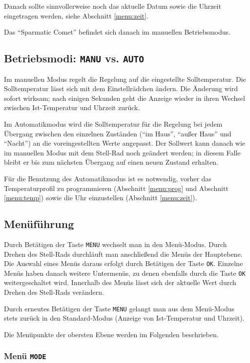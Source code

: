 \documentclass[a5paper]{article}
\newcommand\SC{"`Sparmatic Comet"'}
\begin{document}
Danach sollte sinnvollerweise noch das aktuelle Datum sowie die
Uhrzeit eingetragen werden, siehe Abschnitt \ref{menu:zeit}.

Das \SC{} befindet sich danach im manuellen Betriebsmodus.

\subsection {
  Betriebsmodi: \texttt{MANU} vs. \texttt{AUTO}\label{sec:modi}
}

Im manuellen Modus regelt die Regelung auf die eingestellte Solltemperatur.
Die Solltemperatur lässt sich mit dem Einstellrädchen ändern.  Die
Änderung wird sofort wirksam; nach einigen Sekunden geht die Anzeige
wieder in ihren Wechsel zwischen Ist-Temperatur und Uhrzeit zurück.

Im Automatikmodus wird die Solltemperatur für die Regelung bei jedem
Übergang zwischen den einzelnen Zuständen ("`im Haus"', "`außer Haus"'
und "`Nacht"') an die voreingestellten Werte angepasst.  Der Sollwert
kann danach wie im manuellen Modus mit dem Stell-Rad noch geändert
werden; in diesem Falle bleibt er bis zum nächsten Übergang auf einen
neuen Zustand erhalten.

Für die Benutzung des Automatikmodus ist es notwendig, vorher das
Temperaturprofil zu programmieren (Abschnitt \ref{menu:prog} und
Abschnitt \ref{menu:temp}) sowie die Uhr einzustellen (Abschnitt
\ref{menu:zeit}).

\subsection {
  Menüführung
}

Durch Betätigen der Taste \texttt{MENU} wechselt man in den
Menü-Modus.  Durch Drehen des Stell-Rads durchläuft man anschließend
die Menüs der Hauptebene.  Die Auswahl eines Menüs daraus erfolgt
durch Betätigen der Taste \texttt{OK}.  Einzelne Menüs haben danach
weitere Untermenüs, zu denen ebenfalls durch die Taste \texttt{OK}
weitergeschaltet wird.  Innerhalb des Menüs lässt sich der aktuelle
Wert durch Drehen des Stell-Rads verändern.

Durch erneutes Betätigen der Taste \texttt{MENU} gelangt man aus dem
Menü-Modus stets zurück in den Standard-Modus (Anzeige von
Ist-Temperatur und Uhrzeit).

Die Menüpunkte der obersten Ebene werden im Folgenden beschrieben.

\subsubsection {
  Menü \texttt{MODE}
}
\end{document}
